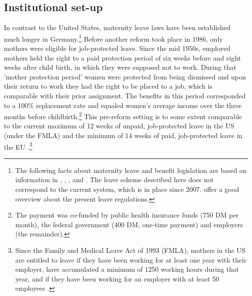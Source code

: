 \documentclass[11pt, a4paper]{article} %
\begin{document}
\subsection[Reform]{Institutional set-up}
In contrast to the United States, maternity leave laws have been established much longer in Germany.\footnote{The following facts about maternity leave and benefit legislation are based on information in \cite{DIW2002}, \cite{schonberg2014expansions}, \cite{Dustmann2012}, and  \cite{zmarzlik1999mutterschutzgesetz}. The leave scheme described here does not correspond to the current system, which is in place since 2007. \cite{Kluve2013} offer a good overview about the present leave regulations.} Before another reform took place in 1986, only mothers were eligible for job-protected leave. Since the mid 1950s, employed mothers held the right to a paid protection period of six weeks before and eight weeks after child birth, in which they were supposed not to work. During that 'mother protection period' women were protected from being dismissed and upon their return to work they had the right to be placed to a job, which is comparable with their prior assignment. The benefits in this period corresponded to a 100\% replacement rate and equaled women's average income over the three months before childbirth.\footnote{The payment was co-funded by public health insurance funds (750 DM per month), the federal government (400 DM, one-time payment) and employers (the remainder).} This pre-reform setting is to some extent comparable to the current maximum of 12 weeks of unpaid, job-protected leave in the US (under the FMLA) and the minimum of 14 weeks of paid, job-protected leave in the EU \citep{guertzgen2018}.\footnote{Since the Family and Medical Leave Act of 1993 (FMLA), mothers in the US are entitled to leave if they have been working for at least one year with their employer, have accumulated a minimum of 1250 working hours during that year, and if they have been working for an employer with at least 50 employees \citep{baum2003effect}.} \newline
\end{document}
